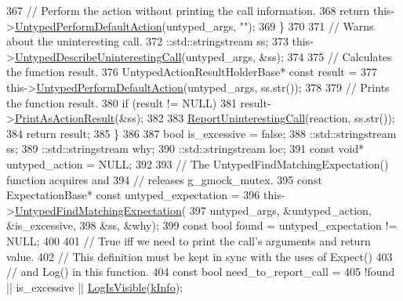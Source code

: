 \begin{DoxyCode}
367       \textcolor{comment}{// Perform the action without printing the call information.}
368       \textcolor{keywordflow}{return} this->\hyperlink{classtesting_1_1internal_1_1UntypedFunctionMockerBase_a2cb149456cd559d5b0615f2310b235e3}{UntypedPerformDefaultAction}(untyped\_args, \textcolor{stringliteral}{""});
369     \}
370 
371     \textcolor{comment}{// Warns about the uninteresting call.}
372     ::std::stringstream ss;
373     this->\hyperlink{classtesting_1_1internal_1_1UntypedFunctionMockerBase_a48a17fa75b744c2bfb19ee1f54d51759}{UntypedDescribeUninterestingCall}(untyped\_args, &ss);
374 
375     \textcolor{comment}{// Calculates the function result.}
376     UntypedActionResultHolderBase* \textcolor{keyword}{const} result =
377         this->\hyperlink{classtesting_1_1internal_1_1UntypedFunctionMockerBase_a2cb149456cd559d5b0615f2310b235e3}{UntypedPerformDefaultAction}(untyped\_args, ss.str());
378 
379     \textcolor{comment}{// Prints the function result.}
380     \textcolor{keywordflow}{if} (result != NULL)
381       result->\hyperlink{classtesting_1_1internal_1_1UntypedActionResultHolderBase_a4b4a558fcb1d3b02c0fec34f186d3b90}{PrintAsActionResult}(&ss);
382 
383     \hyperlink{namespacetesting_1_1internal_a8d99a1e87d0cea563b2bfad8a4e65276}{ReportUninterestingCall}(reaction, ss.str());
384     \textcolor{keywordflow}{return} result;
385   \}
386 
387   \textcolor{keywordtype}{bool} is\_excessive = \textcolor{keyword}{false};
388   ::std::stringstream ss;
389   ::std::stringstream why;
390   ::std::stringstream loc;
391   \textcolor{keyword}{const} \textcolor{keywordtype}{void}* untyped\_action = NULL;
392 
393   \textcolor{comment}{// The UntypedFindMatchingExpectation() function acquires and}
394   \textcolor{comment}{// releases g\_gmock\_mutex.}
395   \textcolor{keyword}{const} ExpectationBase* \textcolor{keyword}{const} untyped\_expectation =
396       this->\hyperlink{classtesting_1_1internal_1_1UntypedFunctionMockerBase_a38714b44836c937fe95524f8d7063d04}{UntypedFindMatchingExpectation}(
397           untyped\_args, &untyped\_action, &is\_excessive,
398           &ss, &why);
399   \textcolor{keyword}{const} \textcolor{keywordtype}{bool} found = untyped\_expectation != NULL;
400 
401   \textcolor{comment}{// True iff we need to print the call's arguments and return value.}
402   \textcolor{comment}{// This definition must be kept in sync with the uses of Expect()}
403   \textcolor{comment}{// and Log() in this function.}
404   \textcolor{keyword}{const} \textcolor{keywordtype}{bool} need\_to\_report\_call =
405       !found || is\_excessive || \hyperlink{namespacetesting_1_1internal_a69ffdba5ee36743e88d8f89b79e566ff}{LogIsVisible}(\hyperlink{namespacetesting_1_1internal_a203d1a8a2147a53d12bbdae40d443914a396aacfaee2849eaab7c1de9773d624d}{kInfo});

\end{DoxyCode}
